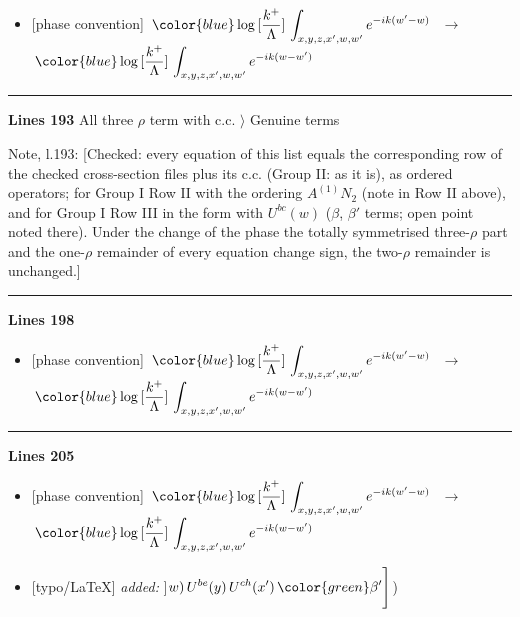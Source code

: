 \documentclass[10pt]{article}
\newenvironment{notebox}{\def\FrameCommand{{\color{notebar}\vrule width 1.5pt}\hspace{6pt}}\MakeFramed{\advance\hsize-\width\FrameRestore}\small}{\endMakeFramed}
\begin{document}
\begin{itemize}[leftmargin=2.2em,itemsep=1pt,topsep=2pt]
\item[\textbf{l.186}] \textsf{\small [phase convention]} $\displaystyle \,{\color{blue}\log{[\frac{k^{+}}{\Lambda}]}}\,\int_{x,y,z,x^{\prime},w,w^{\prime}}e^{-ik(w^{\prime}-w)}\,$\ $\longrightarrow$\ $\displaystyle \,{\color{blue}\log{[\frac{k^{+}}{\Lambda}]}}\,\int_{x,y,z,x^{\prime},w,w^{\prime}}e^{-ik(w-w^{\prime})}\,$
\end{itemize}
\noindent\rule{\linewidth}{0.3pt}\par\noindent\textbf{Lines 193} \quad \textsf{All three $\rho$ term with c.c. $\rangle$ Genuine terms}\par
\begin{notebox}\textsf{\small Note, l.193:} [Checked: every equation of this list equals the corresponding row of the checked cross-section files plus its c.c. (Group II: as it is), as ordered operators; for Group I Row II with the ordering $A^{(1)}N_{2}$ (note in Row II above), and for Group I Row III in the form with $U^{bc}(w)$ ($\beta$, $\beta'$ terms; open point noted there). Under the change of the phase the totally symmetrised three-$\rho$ part and the one-$\rho$ remainder of every equation change sign, the two-$\rho$ remainder is unchanged.]\end{notebox}
\noindent\rule{\linewidth}{0.3pt}\par\noindent\textbf{Lines 198} \par
\begin{itemize}[leftmargin=2.2em,itemsep=1pt,topsep=2pt]
\item[\textbf{l.198}] \textsf{\small [phase convention]} $\displaystyle \, {\color{blue}\log{[\frac{k^{+}}{\Lambda}]}}\,\int_{x,y,z,x^{\prime},w,w^{\prime}}e^{-ik(w^{\prime}-w)}\,$\ $\longrightarrow$\ $\displaystyle \, {\color{blue}\log{[\frac{k^{+}}{\Lambda}]}}\,\int_{x,y,z,x^{\prime},w,w^{\prime}}e^{-ik(w-w^{\prime})}\,$
\end{itemize}
\noindent\rule{\linewidth}{0.3pt}\par\noindent\textbf{Lines 205} \par
\begin{itemize}[leftmargin=2.2em,itemsep=1pt,topsep=2pt]
\item[\textbf{l.205}] \textsf{\small [phase convention]} $\displaystyle \, {\color{blue}\log{[\frac{k^{+}}{\Lambda}]}}\, \int_{x,y,z,x^{\prime},w,w^{\prime}}e^{-ik(w^{\prime}-w)}\,$\ $\longrightarrow$\ $\displaystyle \, {\color{blue}\log{[\frac{k^{+}}{\Lambda}]}}\, \int_{x,y,z,x^{\prime},w,w^{\prime}}e^{-ik(w-w^{\prime})}\,$
\item[\textbf{l.205}] \textsf{\small [typo/LaTeX]} \emph{added:} $\displaystyle \Bigg]$$\displaystyle w)\,U^{be}(y)\,U^{ch}(x')\,{\color{green}\beta'}\Bigg]${\color{gray}\small)}
\end{itemize}
\end{document}

